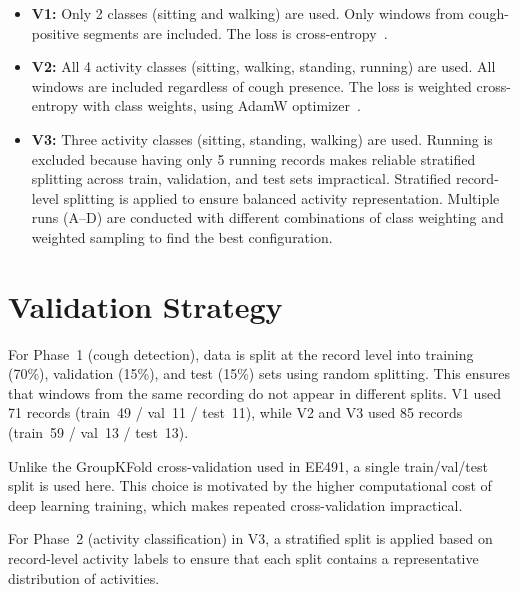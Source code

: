 \begin{itemize}[nosep]
    \item \textbf{V1:} Only 2 classes (sitting and walking) are used. Only windows from cough-positive segments are included. The loss is cross-entropy~\cite{goodfellow2016deep}.
    \item \textbf{V2:} All 4 activity classes (sitting, walking, standing, running) are used. All windows are included regardless of cough presence. The loss is weighted cross-entropy with class weights, using AdamW optimizer~\cite{loshchilov2019adamw}.
    \item \textbf{V3:} Three activity classes (sitting, standing, walking) are used. Running is excluded because having only 5 running records makes reliable stratified splitting across train, validation, and test sets impractical. Stratified record-level splitting is applied to ensure balanced activity representation. Multiple runs (A--D) are conducted with different combinations of class weighting and weighted sampling to find the best configuration.
\end{itemize}

\section{Validation Strategy}

For Phase~1 (cough detection), data is split at the record level into training (70\%), validation (15\%), and test (15\%) sets using random splitting. This ensures that windows from the same recording do not appear in different splits. V1 used 71 records (train~49 / val~11 / test~11), while V2 and V3 used 85 records (train~59 / val~13 / test~13).

Unlike the GroupKFold cross-validation used in EE491, a single train/val/test split is used here. This choice is motivated by the higher computational cost of deep learning training, which makes repeated cross-validation impractical.

For Phase~2 (activity classification) in V3, a stratified split is applied based on record-level activity labels to ensure that each split contains a representative distribution of activities.
